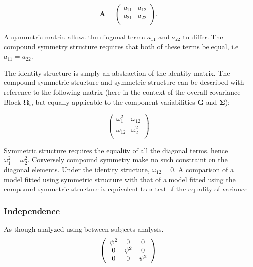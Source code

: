 \documentclass[12pt, a4paper]{report}
\theoremstyle{plain}
\theoremstyle{definition}
\theoremstyle{remark}
\begin{document}
	\[
	\boldsymbol{A} = \left( \begin{array}{cc}
	a_{11} & a_{12}  \\
	a_{21} & a_{22}  \\
	\end{array}\right).
	\]
	
	A symmetric matrix allows the diagonal terms $a_{11}$ and $a_{22}$ to differ. The compound symmetry structure requires that both of these terms be equal, i.e $a_{11} = a_{22}$.
	
	
	The identity structure is simply an abstraction of the identity matrix. The compound symmetric structure and symmetric structure can be described with reference to the following matrix (here in the context of the overall covariance Block-$\boldsymbol{\Omega}_i$, but equally applicable to the component variabilities $\boldsymbol{G}$ and $\boldsymbol{\Sigma}$);
	
	\[\left( \begin{array}{cc}
	\omega^2_1  & \omega_{12} \\
	\omega_{12} & \omega^2_2 \\
	\end{array}\right) \]
	
	Symmetric structure requires the equality of all the diagonal terms, hence $\omega^2_1 = \omega^2_2$. Conversely compound symmetry make no such constraint on the diagonal elements. Under the identity structure, $\omega_{12} = 0$.
	A comparison of a model fitted using symmetric structure with that of a model fitted using the compound symmetric structure is equivalent to a test of the equality of variance.
	
	
	
	
	
	\subsubsection{Independence}
	
	As though analyzed using between subjects analysis.
	\[
	\left(
	\begin{array}{c c c}
	\psi^2 & 0 & 0   \\
	0 & \psi^2 & 0   \\
	0 & 0 & \psi^2   \\
	\end{array}%
	\right)
	\]
	
	
	
\end{document}
